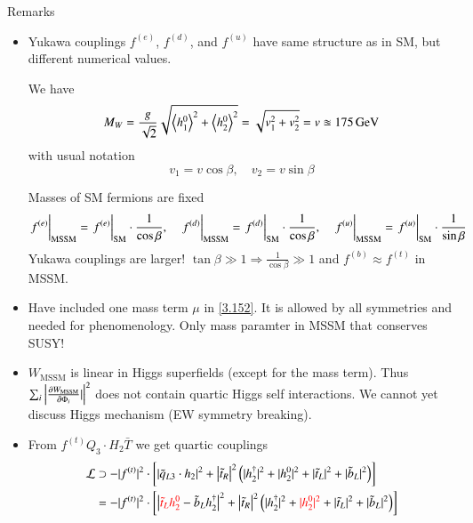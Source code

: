 Remarks
\begin{itemize}
   \item Yukawa couplings $f^{(e)}$, $f^{(d)}$, and $f^{(u)}$ have same structure as in SM, but different numerical values.

      We have 
      \begin{equation*}
         M_W = \frac{g}{\sqrt{2}} \sqrt{ \expval{h_1^0}^2 + \expval{h_2^0}^2  } = \sqrt{v_1^2 + v_2^2} = v \approxeq \SI{175}{\giga \eV}
      \end{equation*}
      with usual notation
      \begin{equation}
         v_1 =  v\cos \beta,\quad v_2 = v \sin \beta \label{3.153}
      \end{equation}

      Masses of SM fermions are fixed 
      \begin{equation}
         \eval{f^{(e)}}_\text{MSSM} = \eval{f^{(e)}}_\text{SM} \cdot \frac{1}{\cos \beta}, \quad 
         \eval{f^{(d)}}_\text{MSSM} = \eval{f^{(d)}}_\text{SM} \cdot \frac{1}{\cos \beta}, \quad
         \eval{f^{(u)}}_\text{MSSM} = \eval{f^{(u)}}_\text{SM} \cdot \frac{1}{\sin \beta} \label{3.154}
      \end{equation}
      Yukawa couplings are larger! $\tan \beta \gg 1 \Rightarrow \frac{1}{\cos \beta} \gg 1$ and $f^{(b)} \approx f^{(t)}$ in MSSM.
   \item Have included one mass term $\mu$ in \eqref{3.152}. It is allowed by all symmetries and needed for phenomenology. Only mass paramter in MSSM that conserves SUSY!
   \item $W_\text{MSSM}$ is linear in Higgs superfields (except for the mass term). Thus $\sum_i \left| \pdv{W_\text{MSSM}}{\Phi_i}| \right|^2 $ does not contain quartic Higgs self interactions. We cannot yet discuss Higgs mechanism (EW symmetry breaking).
   \item From $f^{(t)} Q_3 \cdot H_2 \bar T$ we get quartic couplings
      \begin{align*}
         \lag &\supset - |f^{(t)}|^2 \cdot \left[ \left| \tilde q_{L3} \cdot h_2 \right|^2 + \left|\tilde t_R \right|^2 \left( |h_2^\dagger|^2 + |h_2^0|^2 + |\tilde t_L|^2 + |\tilde b_L|^2 \right) \right] \\
              &= - |f^{(t)}|^2 \cdot \left[ \left| \textcolor{red}{\tilde t_L h_2^0} - \tilde b_L h_2^\dagger \right|^2 + \left|\tilde t_R \right|^2 \left( |h_2^\dagger|^2 + \textcolor{red}{|h_2^0|^2} + |\tilde t_L|^2 + |\tilde b_L|^2 \right) \right] \\

\end{align*}
\end{itemize}
